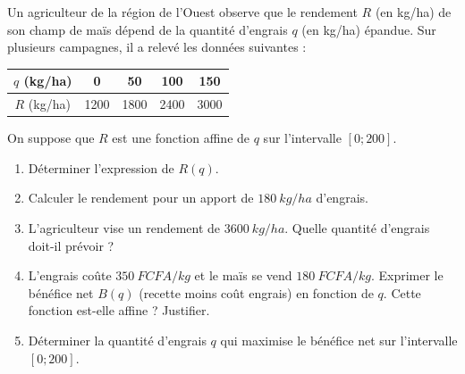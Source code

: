 \documentclass[11pt]{article}
\begin{document}
\begin{exercice}
Un agriculteur de la région de l'Ouest observe que le rendement $R$ (en kg/ha) de son champ de maïs dépend de la quantité d'engrais $q$ (en kg/ha) épandue. Sur plusieurs campagnes, il a relevé les données suivantes :
\begin{center}
\begin{tabular}{|c|c|c|c|c|}
\hline
$q$ (kg/ha) & 0 & 50 & 100 & 150 \\
\hline
$R$ (kg/ha) & 1200 & 1800 & 2400 & 3000 \\
\hline
\end{tabular}
\end{center}
On suppose que $R$ est une fonction affine de $q$ sur l'intervalle $[0 ; 200]$.
\begin{enumerate}
    \item Déterminer l'expression de $R(q)$.
    \item Calculer le rendement pour un apport de $\SI{180}{kg/ha}$ d'engrais.
    \item L'agriculteur vise un rendement de $\SI{3600}{kg/ha}$. Quelle quantité d'engrais doit-il prévoir ?
    \item L'engrais coûte $\SI{350}{F CFA/kg}$ et le maïs se vend $\SI{180}{F CFA/kg}$. Exprimer le bénéfice net $B(q)$ (recette moins coût engrais) en fonction de $q$. Cette fonction est-elle affine ? Justifier.
    \item Déterminer la quantité d'engrais $q$ qui maximise le bénéfice net sur l'intervalle $[0 ; 200]$.
\end{enumerate}
\end{exercice}
\end{document}

